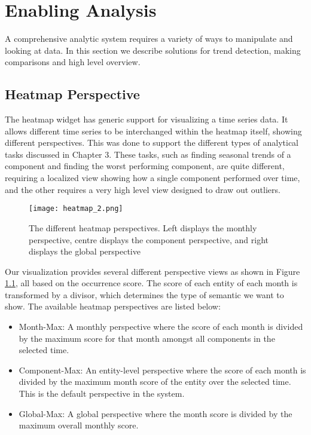 %
\chapter{Enabling Analysis}
A comprehensive analytic system requires a variety of ways to manipulate and
looking at data. In this section we describe solutions for trend detection,
making comparisons and high level overview.
 

\section{Heatmap Perspective}
The heatmap widget has generic support for visualizing a time series data. It 
allows different time series to be interchanged within the heatmap itself, showing 
different perspectives. This was done to support the different types of
analytical tasks discussed in Chapter 3. These tasks, such as
finding seasonal trends of a component and finding the worst performing
component, are quite different, requiring a localized view showing how a
single component performed over time, and the other requires a very high level
view designed to draw out outliers.

	\begin{figure} 
	 \centering  
	 \texttt{[image: heatmap\_2.png]}
	 \caption[Heatmap Perspectives.]{The different heatmap perspectives. Left
	 displays the monthly perspective, centre displays the component perspective, and right displays the
	 global perspective}
	 \label{figure:heatmap}
	\end{figure}


Our visualization provides several different perspective views as shown in
Figure \ref{figure:heatmap}, all based on the occurrence score. The score of
each entity of each month is transformed by a divisor, which determines the
type of semantic we want to show. The available heatmap perspectives are listed below:

\begin{itemize} [noitemsep]
  \item Month-Max: A monthly perspective where the score of each month is 
  divided by the maximum score for that month amongst all components in the selected time.
  
  \item Component-Max: An entity-level perspective where the score of
  each month is divided by the maximum month score of the entity over the
  selected time. This is the default perspective in the system.
  
  \item Global-Max: A global perspective where the month score is divided by the
  maximum overall monthly score.
\end{itemize}
 
